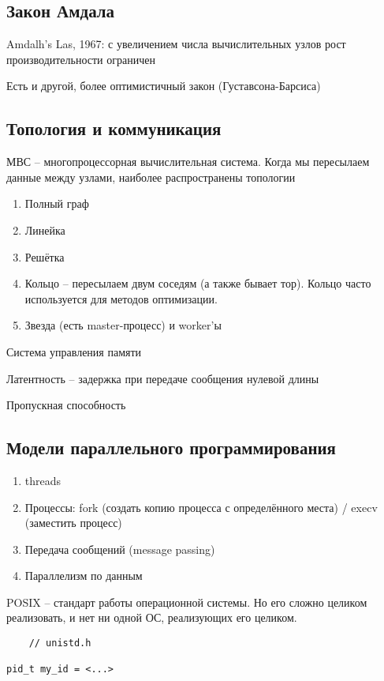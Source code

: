 \documentclass[main.tex]{subfiles}
\begin{document}
\subsection{Закон Амдала}

Amdalh's Las, 1967: с увеличением числа вычислительных узлов рост производительности ограничен

Есть и другой, более оптимистичный закон (Густавсона-Барсиса)

\subsection{Топология и коммуникация}

МВС -- многопроцессорная вычислительная система.
Когда мы пересылаем данные между узлами, наиболее распространены топологии

\begin{enumerate}[noitemsep]
	\item Полный граф
	\item Линейка
	\item Решётка
	\item Кольцо -- пересылаем двум соседям (а также бывает тор).
	Кольцо часто используется для методов оптимизации.
	\item Звезда (есть master-процесс) и worker'ы
\end{enumerate}

Система управления памяти

Латентность -- задержка при передаче сообщения нулевой длины

Пропускная способность

\subsection{ Модели параллельного программирования }

\begin{enumerate}
	\item threads
	\item Процессы: fork (создать копию процесса с определённого места)  / execv (заместить процесс)
	\item Передача сообщений (message passing)
	\item Параллелизм по данным
\end{enumerate}

POSIX -- стандарт работы операционной системы.
Но его сложно целиком реализовать, и нет ни одной ОС, реализующих его целиком.

\begin{verbatim}
	// unistd.h

pid_t my_id = <...>

\end{verbatim}
\end{document}
